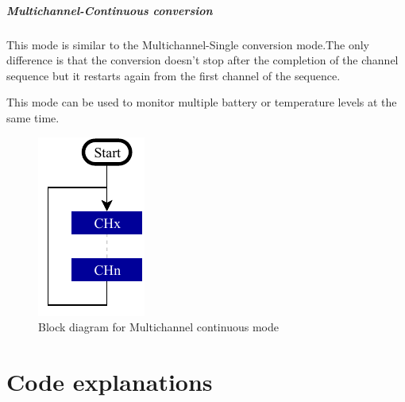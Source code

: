 \documentclass[a4paper, 11pt, openany, oneside]{book}
\begin{document}
\newpage

\paragraph{Multichannel-Continuous conversion}

This mode is similar to the Multichannel-Single conversion mode.The only difference is that the conversion doesn't stop after the completion of the channel sequence but it restarts again from the first channel of the sequence.\newline

This mode can be used to monitor multiple battery or temperature levels at the same time.


\begin{figure}[b]
\centering
\includegraphics[width= 0.2\linewidth]{HS_STM32-single-channel_multi-single-continuous.pdf}
\caption{Block diagram for Multichannel continuous mode}
\end{figure}

\newpage
\chapter{Code explanations}

\renewcommand\listoflistingscaption{List of source codes}
\listoflistings
\end{document}
